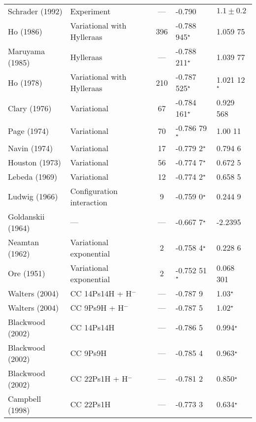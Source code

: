 \documentclass[Dissertation.tex]{subfiles}
\begin{document}
\begin{center}
\begin{longtable}{l l c l l}
Schrader (1992) \cite{Schrader1992} & Experiment & --- & -0.790 & $1.1 \pm 0.2$ \\*
Ho (1986) \cite{Ho1986} & Variational with Hylleraas & 396 & -0.788 945$^\star$ & 1.059 75 \\*
Maruyama (1985) \cite{Maruyama1985,Saito2003a} & Hylleraas & --- & -0.788 211$^\star$ & 1.039 77 \\*
Ho (1978) \cite{Ho1978} & Variational with Hylleraas & 210 & -0.787 525$^\star$ & 1.021 12$^\star$ \\*
Clary (1976) \cite{Clary1976} & Variational & 67 & -0.784 161$^\star$ & 0.929 568 \\*
Page (1974) \cite{Page1974} & Variational & 70 & -0.786 79$^\star$ & 1.00 11 \\*
Navin (1974) \cite{Navin1974} & Variational & 17 & -0.779 2$^\star$ & 0.794 6 \\*
Houston (1973) \cite{Houston1973} & Variational & 56 & -0.774 7$^\star$ & 0.672 5 \\*
Lebeda (1969) \cite{Lebeda1969} & Variational & 12 & -0.774 2$^\star$ & 0.658 5 \\*
Ludwig (1966) \cite{Ludwig1966} & Configuration interaction & 9 & -0.759 0$^\star$ & 0.244 9 \\*
Goldanskii (1964) \cite{Goldanskii1964,Clary1976} & --- & --- & -0.667 7$^\star$ & -2.2395 \\*
Neamtan (1962) \cite{Neamtan1962} & Variational exponential & 2 & -0.758 4$^\star$ & 0.228 6 \\*
Ore (1951) \cite{Ore1951} & Variational exponential & 2 & -0.752 51$^\star$ & 0.068 301 \\*
Walters (2004) \cite{Walters2004} & CC 14Ps14H + H$^-$ & --- & -0.787 9 & 1.03$^\star$\\*
Walters (2004) \cite{Walters2004} & CC 9Ps9H + H$^-$ & --- & -0.787 5 & 1.02$^\star$\\*
Blackwood (2002) \cite{Blackwood2002} & CC 14Ps14H & --- & -0.786 5  & 0.994$^\star$ \\*
Blackwood (2002) \cite{Blackwood2002} & CC 9Ps9H & --- & -0.785 4 & 0.963$^\star$ \\*
Blackwood (2002) \cite{Blackwood2002b} & CC 22Ps1H + H$^-$ & --- & -0.781 2 & 0.850$^\star$ \\*
Campbell (1998) \cite{Campbell1998} & CC 22Ps1H & --- & -0.773 3 & 0.634$^\star$ \\*
\bottomrule
\end{longtable}
\end{center}
\end{document}
